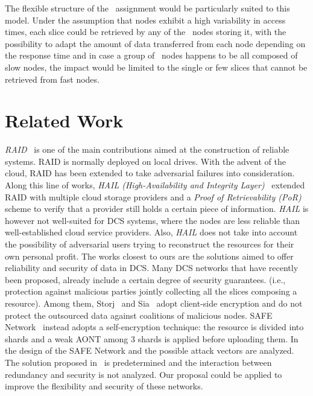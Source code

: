{  The flexible structure of the \compact\ assignment would be
  particularly suited to this model. Under the assumption that nodes
  exhibit a high variability in access times, each slice could be
  retrieved by any of the \R\ nodes storing it, with the possibility
  to adapt the amount of data transferred from each node depending on
  the response time and in case a group of \R\ nodes happens to be all
  composed of slow nodes, the impact would be limited to the single or
  few slices that cannot be retrieved from fast nodes.



\section{Related Work}\label{dcs:sec:relwork}


{\em RAID}~\cite{Patterson:1988:CRA:971701.50214} is one of the main
contributions aimed at the construction of reliable systems.  RAID is
normally deployed on local drives.  With the advent of the cloud, RAID
has been extended to take adversarial failures into
consideration. Along this line of works, {\em HAIL (High-Availability
  and Integrity Layer)}~\cite{bowers2009hail} extended RAID with
multiple cloud storage providers and a {\em Proof of Retrievability
  (PoR)}~\cite{bowers2009proofs} scheme to verify that a provider
still holds a certain piece of information.  {\em HAIL} is however not
well-suited for DCS systems, where the nodes are less reliable than
well-established cloud service providers. Also, {\em HAIL} does not
take into account the possibility of adversarial users trying to
reconstruct the resources for their own personal profit.  The works
closest to ours are the solutions aimed to offer reliability and
security of data in DCS. Many DCS networks that have recently been
proposed, already include a certain degree of security guarantees.
(i.e., protection against malicious parties jointly collecting all the
slices composing a resource).  Among them,
Storj~\cite{wilkinson2014storj} and Sia~\cite{vorick2014sia} adopt
client-side encryption and do not protect the outsourced data against
coalitions of malicious nodes.  SAFE Network~\cite{irvine2010maidsafe}
instead adopts a self-encryption technique: the resource is divided
into shards and a weak AONT among 3 shards is applied before uploading
them.  In~\cite{paul2014security} the design of the SAFE Network and
the possible attack vectors are analyzed.  The solution proposed
in~\cite{irvine2010maidsafe,paul2014security} is predetermined and the
interaction between redundancy and security is not analyzed.  Our
proposal could be applied to improve the flexibility and security of
these networks.


}
